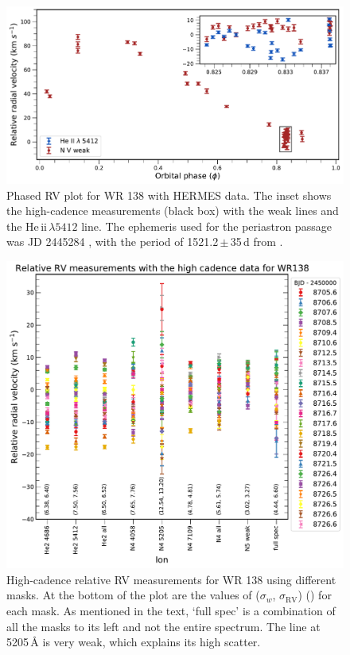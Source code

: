 \begin{figure}
    \centering
    \includegraphics[width=\textwidth]{chapters/WNE/image/WR138_nogrid.pdf}
    \caption{Phased RV plot for WR 138 with HERMES data. The inset shows the high-cadence measurements (black box) with the \nv{} weak lines and the He\,{\sc ii}\,$\lambda 5412$ line. The ephemeris used for the periastron passage was JD 2445284 \citep{1990Annuk}, with the period of 1521.2\,$\pm$\,35\,d from \citet{2013Palate}.}
    \label{fig:WR138_phased}
\end{figure}

\begin{figure}[t]
    \centering
    \includegraphics[width=\textwidth]{chapters/WNE/image/RV_SC_ions_nogrid.pdf}
    \caption{High-cadence relative RV measurements for WR 138 using different masks. At the bottom of the plot are the values of ($\sigma_w$, $\sigma_{\textrm{RV}}$) (\kms{}) for each mask. As mentioned in the text, `full spec' is a combination of all the masks to its left and not the entire spectrum. The \niv{} line at 5205\,\r{A} is very weak, which explains its high scatter.}
    \label{fig:sc_ions}
\end{figure}
